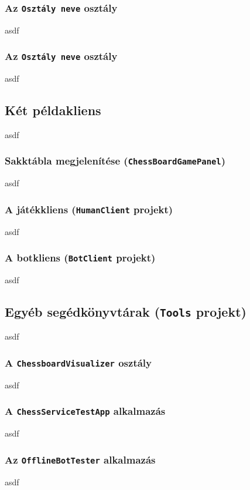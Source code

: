 \documentclass[twoside, a4paper, 12pt]{article}
\begin{document}
\subsubsection{Az \texttt{Osztály neve} osztály}
asdf
\subsubsection{Az \texttt{Osztály neve} osztály}
asdf

\subsection{Két példakliens}
asdf
\subsubsection{Sakktábla megjelenítése (\texttt{ChessBoardGamePanel})}
asdf
\subsubsection{A játékkliens (\texttt{HumanClient} projekt)}
asdf
\subsubsection{A botkliens (\texttt{BotClient} projekt)}
asdf

\subsection{Egyéb segédkönyvtárak (\texttt{Tools} projekt)}
asdf
\subsubsection{A \texttt{ChessboardVisualizer} osztály}
asdf
\subsubsection{A \texttt{ChessServiceTestApp} alkalmazás}
asdf
\subsubsection{Az \texttt{OfflineBotTester} alkalmazás}
asdf
\end{document}
